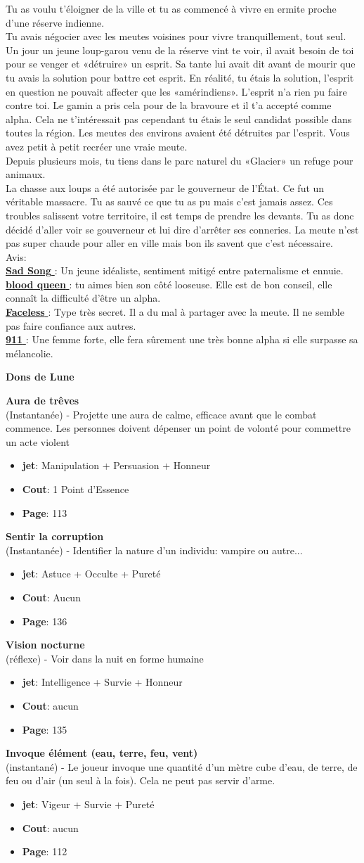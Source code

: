 \documentclass[oneside,12pt]{book}
\newcommand\don[6]{
\textbf{#1} \\
(#6) - #2
\begin{itemize}
\item{ \textbf{jet}: #3}
\item{ \textbf{Cout}: #4}
\item{ \textbf{Page}: #5}
\end{itemize}
\vspace{0.5cm}
}
\newcommand{\Mathew}{\textbf{Sad Song} }
\newcommand{\Laura}{\textbf{blood queen} }
\newcommand{\Andy}{\textbf{Faceless} }
\newcommand{\Kelly}{\textbf{911} }
\begin{document}
\begin{flushleft}
\begin{description}
{Tu as voulu t’éloigner de la ville et tu as commencé à vivre en ermite proche d'une réserve indienne. \\
Tu avais négocier avec les meutes voisines pour vivre tranquillement, tout seul. Un jour un jeune loup-garou venu de la réserve vint te voir, il avait besoin de toi pour se venger et «détruire» un esprit. Sa tante lui avait dit avant de mourir que tu avais la solution pour battre cet esprit. En réalité, tu étais la solution, l’esprit en question ne pouvait affecter que les «amérindiens». L'esprit n'a rien pu faire contre toi. Le gamin a pris cela pour de la bravoure et il t’a accepté comme alpha. Cela ne t’intéressait pas cependant tu étais le seul candidat possible dans toutes la région. Les meutes des environs avaient été détruites par l’esprit.
Vous avez petit à petit recréer une vraie meute. \\
Depuis plusieurs mois, tu tiens dans le parc naturel du «Glacier» un refuge pour animaux. \\
La chasse aux loups a été autorisée par le gouverneur de l’État. Ce fut un véritable massacre. Tu as sauvé ce que tu as pu mais c'est jamais assez. Ces troubles salissent votre territoire, il est temps de prendre les devants. Tu as donc décidé d'aller voir se gouverneur et lui dire d’arrêter ses conneries. La meute n’est pas super chaude pour aller en ville mais bon ils savent que c’est nécessaire. \\

Avis:\\
\underline{\Mathew} : Un jeune idéaliste, sentiment mitigé entre paternalisme et ennuie.\\
\underline{\Laura} : tu aimes bien son côté looseuse. Elle est de bon conseil, elle connaît la difficulté d'être un alpha.  \\
\underline{\Andy} : Type très secret. Il a du mal à partager avec la meute. Il ne semble pas faire confiance aux autres. \\
\underline{\Kelly} : Une femme forte, elle fera sûrement une très bonne alpha si elle surpasse sa mélancolie. \\
}
\end{description}
\clearpage
\textbf{\large Dons de Lune} \\
\vspace{0.5cm}
\don{Aura de trêves}{Projette une aura de calme, efficace avant que le combat commence. Les personnes doivent dépenser un point de volonté pour commettre un acte violent}{Manipulation + Persuasion + Honneur}{1 Point d’Essence}{113}{Instantanée}
\don{Sentir la corruption}{Identifier la nature d'un individu: vampire ou autre...}{Astuce + Occulte + Pureté}{Aucun}{136}{Instantanée}
\don{Vision nocturne}{Voir dans la nuit en forme humaine}{Intelligence + Survie + Honneur}{aucun}{135}{réflexe}
\don{Invoque élément (eau, terre, feu, vent)}{Le joueur invoque une quantité d’un mètre cube d’eau, de terre, de feu ou d’air (un seul à la fois). Cela ne peut pas servir d’arme.}{Vigeur + Survie + Pureté}{aucun}{112}{instantané}


\end{flushleft}
\end{document}
